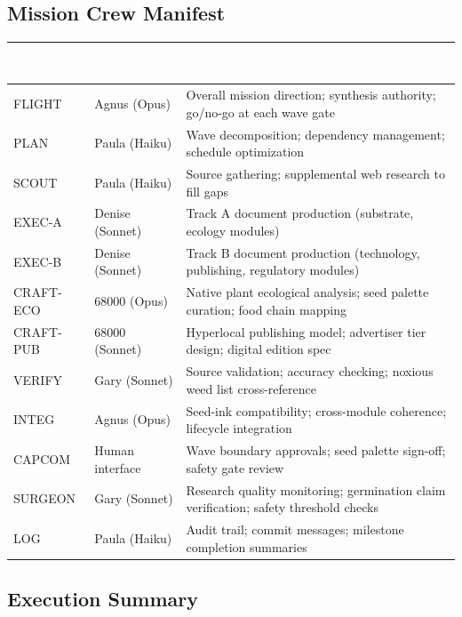 \documentclass[11pt,letterpaper]{article}
\newcommand{\tableheader}[1]{\textbf{\sffamily\textcolor{white}{#1}}}
\begin{document}
\subsection{Mission Crew Manifest}

\begin{center}
\begin{tabularx}{\textwidth}{L{2cm}L{3cm}X}
\toprule
{}
\tableheader{Role} & \tableheader{Agent (Chipset)} & \tableheader{Responsibility} \\
\midrule
FLIGHT & Agnus (Opus) & Overall mission direction; synthesis authority; go/no-go at each wave gate \\
PLAN & Paula (Haiku) & Wave decomposition; dependency management; schedule optimization \\
SCOUT & Paula (Haiku) & Source gathering; supplemental web research to fill gaps \\
EXEC-A & Denise (Sonnet) & Track A document production (substrate, ecology modules) \\
EXEC-B & Denise (Sonnet) & Track B document production (technology, publishing, regulatory modules) \\
CRAFT-ECO & 68000 (Opus) & Native plant ecological analysis; seed palette curation; food chain mapping \\
CRAFT-PUB & 68000 (Sonnet) & Hyperlocal publishing model; advertiser tier design; digital edition spec \\
VERIFY & Gary (Sonnet) & Source validation; accuracy checking; noxious weed list cross-reference \\
INTEG & Agnus (Opus) & Seed-ink compatibility; cross-module coherence; lifecycle integration \\
CAPCOM & Human interface & Wave boundary approvals; seed palette sign-off; safety gate review \\
SURGEON & Gary (Sonnet) & Research quality monitoring; germination claim verification; safety threshold checks \\
LOG & Paula (Haiku) & Audit trail; commit messages; milestone completion summaries \\
\bottomrule
\end{tabularx}
\end{center}

\subsection{Execution Summary}
\end{document}
